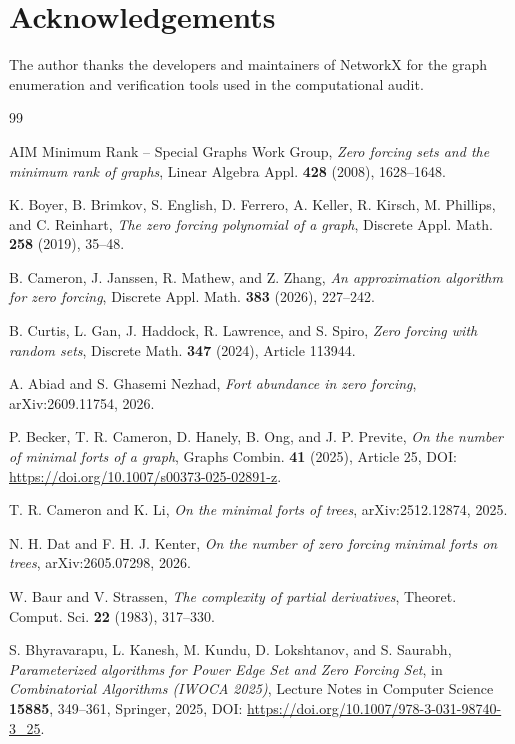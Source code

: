 \documentclass[11pt,reqno]{amsart}
\theoremstyle{definition}
\begin{document}
\section*{Acknowledgements}

The author thanks the developers and maintainers of NetworkX for the graph
enumeration and verification tools used in the computational audit.

\begin{thebibliography}{99}

AIM Minimum Rank -- Special Graphs Work Group,
\emph{Zero forcing sets and the minimum rank of graphs},
Linear Algebra Appl. \textbf{428} (2008), 1628--1648.

K. Boyer, B. Brimkov, S. English, D. Ferrero, A. Keller, R. Kirsch,
M. Phillips, and C. Reinhart,
\emph{The zero forcing polynomial of a graph},
Discrete Appl. Math. \textbf{258} (2019), 35--48.

B. Cameron, J. Janssen, R. Mathew, and Z. Zhang,
\emph{An approximation algorithm for zero forcing},
Discrete Appl. Math. \textbf{383} (2026), 227--242.

B. Curtis, L. Gan, J. Haddock, R. Lawrence, and S. Spiro,
\emph{Zero forcing with random sets},
Discrete Math. \textbf{347} (2024), Article 113944.

A. Abiad and S. Ghasemi Nezhad,
\emph{Fort abundance in zero forcing},
arXiv:2609.11754, 2026.

P. Becker, T. R. Cameron, D. Hanely, B. Ong, and J. P. Previte,
\emph{On the number of minimal forts of a graph},
Graphs Combin. \textbf{41} (2025), Article 25,
DOI: \url{https://doi.org/10.1007/s00373-025-02891-z}.

T. R. Cameron and K. Li,
\emph{On the minimal forts of trees},
arXiv:2512.12874, 2025.

N. H. Dat and F. H. J. Kenter,
\emph{On the number of zero forcing minimal forts on trees},
arXiv:2605.07298, 2026.

W. Baur and V. Strassen,
\emph{The complexity of partial derivatives},
Theoret. Comput. Sci. \textbf{22} (1983), 317--330.

S. Bhyravarapu, L. Kanesh, M. Kundu, D. Lokshtanov, and S. Saurabh,
\emph{Parameterized algorithms for Power Edge Set and Zero Forcing Set},
in \emph{Combinatorial Algorithms (IWOCA 2025)}, Lecture Notes in Computer
Science \textbf{15885}, 349--361, Springer, 2025,
DOI: \url{https://doi.org/10.1007/978-3-031-98740-3_25}.


\end{thebibliography}
\end{document}
